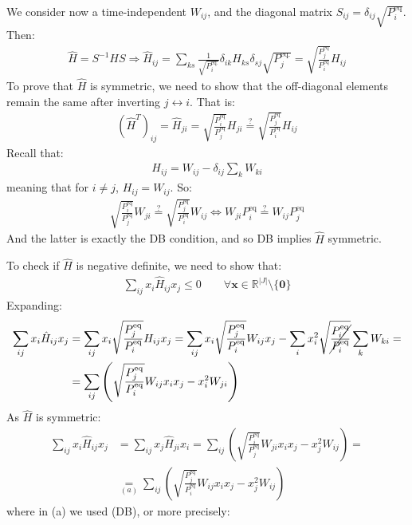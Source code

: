 \documentclass[../template.tex]{subfiles}
\begin{document}
\begin{exo}
\begin{enumerate}
        We consider now a time-independent $W_{ij}$, and the diagonal matrix $S_{ij} = \delta_{ij} \sqrt{P_i^{\mathrm{eq}}}$. Then:
        \begin{align*}
            \hat{H} = S^{-1} H S \Rightarrow 
            \hat{H}_{ij} = \sum_{ks}  \frac{1}{\sqrt{P_i^{\mathrm{eq.}} }} \delta_{ik}H_{ks} \delta_{sj} \sqrt{P_j^{\mathrm{eq.}}} = \sqrt{\frac{P_j^{\mathrm{eq} }}{P_i^{\mathrm{eq}}} } H_{ij}
        \end{align*} 
        To prove that $\hat{H}$ is symmetric, we need to show that the off-diagonal elements remain the same after inverting $j \leftrightarrow i$. That is:
        \begin{align*}
            (\hat{H}^T)_{ij} = \hat{H}_{ji} = \sqrt{\frac{P_i^{\mathrm{eq} }}{P_j^{\mathrm{eq}}} } H_{ji} \overset{?}{=}  \sqrt{\frac{P_j^{\mathrm{eq} }}{P_i^{\mathrm{eq}}} } H_{ij}
        \end{align*}
        Recall that:
        \begin{align*}
            H_{ij} = W_{ij} - \delta_{ij} \sum_k W_{ki}
        \end{align*}
        meaning that for $i \neq j$, $H_{ij} = W_{ij}$. So:
        \begin{align*}
            \sqrt{\frac{P_i^{\mathrm{eq} }}{P_j^{\mathrm{eq}}} } W_{ji} \overset{?}{=}  \sqrt{\frac{P_j^{\mathrm{eq} }}{P_i^{\mathrm{eq}}} } W_{ij} \Leftrightarrow  W_{ji} P_i^{\mathrm{eq}} \overset{?}{=} W_{ij} P_{j}^{\mathrm{eq}}
        \end{align*}
        And the latter is exactly the DB condition, and so DB implies $\hat{H}$ symmetric.

        To check if $\hat{H}$ is negative definite, we need to show that:
        \begin{align*}
            \sum_{ij} x_i \hat{H}_{ij} x_j \leq 0 \qquad \forall \bm{x} \in \mathbb{R}^{|J|} \setminus \{\bm{0}\} 
        \end{align*}
        Expanding:
        \begin{align*}
            \sum_{ij} x_i \hat{H}_{ij} x_j &= \sum_{ij} x_i \sqrt{\frac{P_j^{\mathrm{eq} }}{P_i^{\mathrm{eq} }} } H_{ij} x_j = \sum_{ij} x_i \sqrt{\frac{P_j^{\mathrm{eq} }}{P_i^{\mathrm{eq} }} } W_{ij} x_j - \sum_{i} x_i^2  \sqrt{\cancel{\frac{P_i^{\mathrm{eq} }}{P_i^{\mathrm{eq} }}} } \sum_k W_{ki} =\\
            &= \sum_{ij} \left( \sqrt{\frac{P_j^{\mathrm{eq} }}{P_i^{\mathrm{eq} }} } W_{ij} x_i x_j - x_i^2 W_{ji}\right)
        \end{align*}
        As $\hat{H}$ is symmetric:
        \begin{align*}
            \sum_{ij} x_i \hat{H}_{ij} x_j &= \sum_{ij} x_j \hat{H}_{ji} x_i = \sum_{ij} \left( \sqrt{\frac{P_i^{\mathrm{eq} }}{P_j^{\mathrm{eq} }} } W_{ji} x_i x_j - x_j^2 W_{ij}\right) =\\
            & \underset{(a)}{=} \sum_{ij} \left( \sqrt{\frac{P_j^{\mathrm{eq} }}{P_i^{\mathrm{eq} }} } W_{ij} x_i x_j -  x_j^2 W_{ij}\right)
        \end{align*}
        where in (a) we used (DB), or more precisely:
        

\end{enumerate}
\end{exo}
\end{document}
